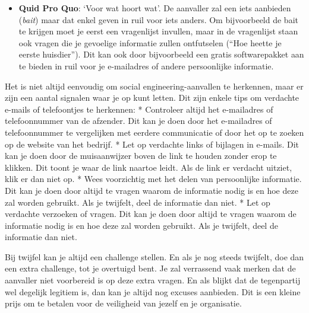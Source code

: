 \documentclass[
  10pt,
  dutch,
  paper=a4,
  ,captions=tableheading
]{scrbook}
\begin{document}
\begin{itemize}
  \textbf{Baiting}: Deze techniek zal het slachtoffer lokken met iets
  dat hij echt wilt. Denk maar aan een USB-stick van het bedrijf, gratis
  een maand toegang tot Spotify Premium, etc. Van zodra je de
  \emph{bait} aanvaardt, zal via deze weg meestal de aanval verder gezet
  worden (denk maar een virus dat op de USB-stick staat, of de link naar
  de gratis Spotify blijkt een link naar een malware server te zijn.)
  Het paard van Troje is een mooi voorbeeld van social engineering met
  behulp van \emph{baiting}.
\item
  \textbf{Quid Pro Quo}: `Voor wat hoort wat'. De aanvaller zal een iets
  aanbieden (\emph{bait}) maar dat enkel geven in ruil voor iets anders.
  Om bijvoorbeeld de bait te krijgen moet je eerst een vragenlijst
  invullen, maar in de vragenlijst staan ook vragen die je gevoelige
  informatie zullen ontfutselen (``Hoe heette je eerste huisdier''). Dit
  kan ook door bijvoorbeeld een gratis softwarepakket aan te bieden in
  ruil voor je e-mailadres of andere persoonlijke informatie.
\end{itemize}

Het is niet altijd eenvoudig om social engineering-aanvallen te
herkennen, maar er zijn een aantal signalen waar je op kunt letten. Dit
zijn enkele tips om verdachte e-mails of telefoontjes te herkennen: *
Controleer altijd het e-mailadres of telefoonnummer van de afzender. Dit
kan je doen door het e-mailadres of telefoonnummer te vergelijken met
eerdere communicatie of door het op te zoeken op de website van het
bedrijf. * Let op verdachte links of bijlagen in e-mails. Dit kan je
doen door de muisaanwijzer boven de link te houden zonder erop te
klikken. Dit toont je waar de link naartoe leidt. Als de link er
verdacht uitziet, klik er dan niet op. * Wees voorzichtig met het delen
van persoonlijke informatie. Dit kan je doen door altijd te vragen
waarom de informatie nodig is en hoe deze zal worden gebruikt. Als je
twijfelt, deel de informatie dan niet. * Let op verdachte verzoeken of
vragen. Dit kan je doen door altijd te vragen waarom de informatie nodig
is en hoe deze zal worden gebruikt. Als je twijfelt, deel de informatie
dan niet.

Bij twijfel kan je altijd een challenge stellen. En als je nog steeds
twijfelt, doe dan een extra challenge, tot je overtuigd bent. Je zal
verrassend vaak merken dat de aanvaller niet voorbereid is op deze extra
vragen. En als blijkt dat de tegenpartij wel degelijk legitiem is, dan
kan je altijd nog excuses aanbieden. Dit is een kleine prijs om te
betalen voor de veiligheid van jezelf en je organisatie.
\end{document}
